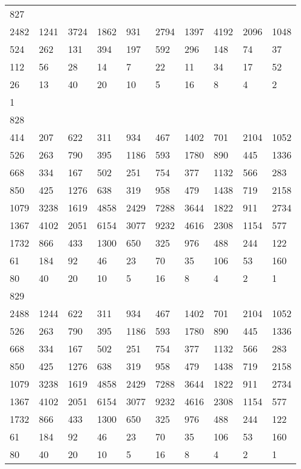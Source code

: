 \begin{longtable}{*{10}{l}}
827&&&&&&&&&\\
2482& 1241& 3724& 1862& 931& 2794& 1397& 4192& 2096& 1048\\
524& 262& 131& 394& 197& 592& 296& 148& 74& 37\\
112& 56& 28& 14& 7& 22& 11& 34& 17& 52\\
26& 13& 40& 20& 10& 5& 16& 8& 4& 2\\
1& \\

828&&&&&&&&&\\
414& 207& 622& 311& 934& 467& 1402& 701& 2104& 1052\\
526& 263& 790& 395& 1186& 593& 1780& 890& 445& 1336\\
668& 334& 167& 502& 251& 754& 377& 1132& 566& 283\\
850& 425& 1276& 638& 319& 958& 479& 1438& 719& 2158\\
1079& 3238& 1619& 4858& 2429& 7288& 3644& 1822& 911& 2734\\
1367& 4102& 2051& 6154& 3077& 9232& 4616& 2308& 1154& 577\\
1732& 866& 433& 1300& 650& 325& 976& 488& 244& 122\\
61& 184& 92& 46& 23& 70& 35& 106& 53& 160\\
80& 40& 20& 10& 5& 16& 8& 4& 2& 1\\

829&&&&&&&&&\\
2488& 1244& 622& 311& 934& 467& 1402& 701& 2104& 1052\\
526& 263& 790& 395& 1186& 593& 1780& 890& 445& 1336\\
668& 334& 167& 502& 251& 754& 377& 1132& 566& 283\\
850& 425& 1276& 638& 319& 958& 479& 1438& 719& 2158\\
1079& 3238& 1619& 4858& 2429& 7288& 3644& 1822& 911& 2734\\
1367& 4102& 2051& 6154& 3077& 9232& 4616& 2308& 1154& 577\\
1732& 866& 433& 1300& 650& 325& 976& 488& 244& 122\\
61& 184& 92& 46& 23& 70& 35& 106& 53& 160\\
80& 40& 20& 10& 5& 16& 8& 4& 2& 1\\


\end{longtable}

